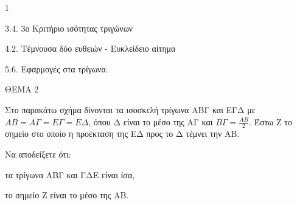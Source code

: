 \begin{ylh}{1}
    \item 3.4. 3ο Κριτήριο ισότητας τριγώνων
    \item 4.2. Τέμνουσα δύο ευθειών - Ευκλείδειο αίτημα
    \item 5.6. Εφαρμογές στα τρίγωνα.
\end{ylh}

ΘΕΜΑ 2

Στο παρακάτω σχήμα δίνονται τα ισοσκελή τρίγωνα ΑΒΓ και ΕΓΔ με $ΑΒ = Α\Gamma = Ε\Gamma = Ε\Delta$, όπου Δ είναι το μέσο της ΑΓ και $Β\Gamma = \frac{ΑΒ}{2}$. Έστω Ζ το σημείο στο οποίο η προέκταση της ΕΔ προς το Δ τέμνει την ΑΒ.

Να αποδείξετε ότι:

\begin{alist}
\item τα τρίγωνα ΑΒΓ και ΓΔΕ είναι ίσα, 

\item το σημείο Ζ είναι το μέσο της ΑΒ. 


\begin{center}
\end{center}
\end{alist}
